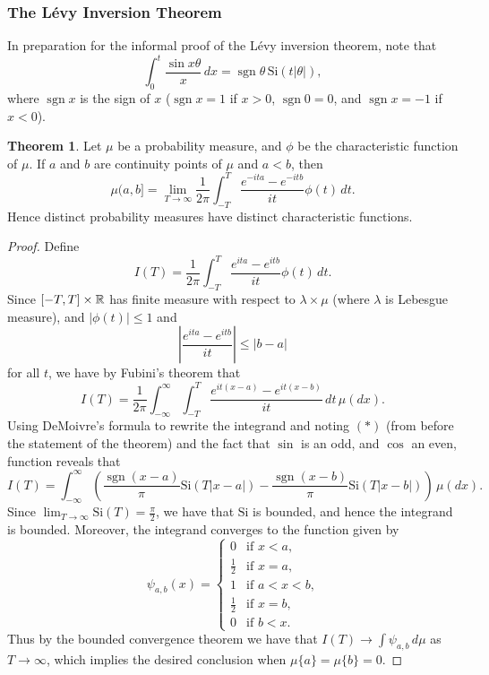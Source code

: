 \documentclass[leqno]{article}
\theoremstyle{definition}
\newtheorem{theorem}{Theorem}[section]
\newcommand\Si{\text{Si}}
\newcommand\sgn{\mathop{\text{sgn}}\nolimits}
\begin{document}
\subsubsection{The L\'evy Inversion Theorem}

In preparation for the informal proof of the L\'evy inversion theorem, note that
\begin{equation*} \tag{*}
\int_0^t \frac{\sin x\theta}{x} \, dx = \sgn \theta \, \Si(t|\theta|),
\end{equation*}
where $\sgn x$ is the sign of $x$ ($\sgn x = 1$ if $x > 0$, $\sgn 0 = 0$, and $\sgn x = -1$ if $x < 0$).

\begin{theorem}
Let $\mu$ be a probability measure, and $\phi$ be the characteristic function of $\mu$. If $a$ and $b$ are continuity points of $\mu$ and $a < b$, then
\[ \mu (a,b] = \lim_{T \rightarrow \infty} \frac{1}{2\pi} \int_{-T}^T \frac{e^{-ita} - e^{-itb}}{it} \phi(t) \, dt. \]
Hence distinct probability measures have distinct characteristic functions.
\end{theorem}

\begin{proof}
Define
\[ I(T) = \frac{1}{2\pi} \int_{-T}^T \frac{e^{ita} - e^{itb}}{it} \phi(t) \, dt. \]
Since $[-T,T] \times \mathbb{R}$ has finite measure with respect to $\lambda \times \mu$ (where $\lambda$ is Lebesgue measure), and $|\phi(t)| \le 1$ and
\[ \left|\frac{e^{ita} - e^{itb}}{it}\right| \le |b-a| \]
for all $t$, we have by Fubini's theorem that
\[ I(T) = \frac{1}{2\pi} \int_{-\infty}^\infty \int_{-T}^T \frac{e^{it(x-a)} - e^{it(x-b)}}{it} \, dt \, \mu(dx). \]
Using DeMoivre's formula to rewrite the integrand and noting $(*)$ (from before the statement of the theorem) and the fact that $\sin$ is an odd, and $\cos$ an even, function reveals that
\[ I(T) = \int_{-\infty}^\infty \left(\frac{\sgn (x-a)}{\pi} \Si(T|x-a|) - \frac{\sgn (x-b)}{\pi} \Si(T|x-b|)\right) \, \mu(dx). \]
Since $\lim_{T \rightarrow \infty} \Si(T) = \frac{\pi}{2}$, we have that $\Si$ is bounded, and hence the integrand is bounded. Moreover, the integrand converges to the function given by
\[ \psi_{a,b}(x) = \begin{cases} 0 & \text{if $x < a$,} \\
                                 \frac{1}{2} & \text{if $x = a$,} \\
                                 1 & \text{if $a < x < b$,} \\
                                 \frac{1}{2} & \text{if $x = b$,} \\
                                 0 & \text{if $b < x$.} \end{cases} \]
Thus by the bounded convergence theorem we have that $I(T) \rightarrow \int \psi_{a,b} \, d\mu$ as $T \rightarrow \infty$, which implies the desired conclusion when $\mu \{a\} = \mu \{b\} = 0$.
\end{proof}
\end{document}
